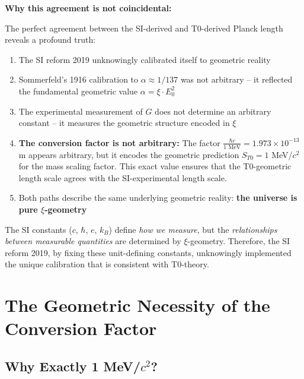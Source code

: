 \documentclass[12pt,a4paper]{article}
\begin{document}
	\begin{warning}
		\textbf{Why this agreement is not coincidental:}
		
		The perfect agreement between the SI-derived and T0-derived Planck length reveals a profound truth:
		
		\begin{enumerate}
			\item The SI reform 2019 unknowingly calibrated itself to geometric reality
			
			\item Sommerfeld's 1916 calibration to $\alpha \approx 1/137$ was not arbitrary -- it reflected the fundamental geometric value $\alpha = \xi \cdot E_0^2$
			
			\item The experimental measurement of $G$ does not determine an arbitrary constant -- it measures the geometric structure encoded in $\xi$
			
			\item \textbf{The conversion factor is not arbitrary:} The factor $\frac{\hbar c}{1 \text{ MeV}} = 1.973 \times 10^{-13}$ m appears arbitrary, but it encodes the geometric prediction $S_{T0} = 1$ MeV/$c^2$ for the mass scaling factor. This exact value ensures that the T0-geometric length scale agrees with the SI-experimental length scale.
			
			\item Both paths describe the same underlying geometric reality: \textbf{the universe is pure $\xi$-geometry}
		\end{enumerate}
		
		The SI constants ($c$, $\hbar$, $e$, $k_B$) define \emph{how we measure}, but the \emph{relationships between measurable quantities} are determined by $\xi$-geometry. Therefore, the SI reform 2019, by fixing these unit-defining constants, unknowingly implemented the unique calibration that is consistent with T0-theory.
	\end{warning}
	
	\section{The Geometric Necessity of the Conversion Factor}
	
	\subsection{Why Exactly 1 MeV/$c^2$?}
	
\end{document}
